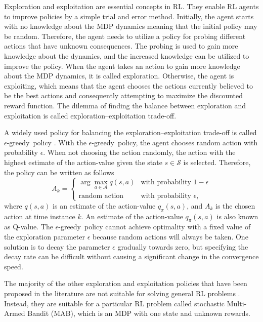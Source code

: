 \documentclass[english, 12pt, a4paper, elec, utf8, a-1b, online]{aaltothesis}
\numberwithin{equation}{section}
\newcommand{\Ss}{\mathcal{S}}
\newcommand{\As}{\mathcal{A}}
\newcommand{\egreedy}{$\epsilon$-greedy~}
\begin{document}
Exploration and exploitation are essential concepts in RL. 
They enable RL agents to improve policies by a simple trial and error method.
Initially, the agent starts with no knowledge about the MDP dynamics meaning that the initial policy may be random.
Therefore, the agent needs to utilize a policy for probing different actions that have unknown consequences.
The probing is used to gain more knowledge about the dynamics, and the increased knowledge can be utilized to improve the policy.
When the agent takes an action to gain more knowledge about the MDP dynamics, it is called exploration.
Otherwise, the agent is exploiting, which means that the agent chooses the actions currently believed to be the best actions and consequently attempting to maximize the discounted reward function.
The dilemma of finding the balance between exploration and exploitation is called exploration--exploitation trade-off.

A widely used policy for balancing the exploration--exploitation trade-off is called \egreedy policy \cite{Sutton2018}.
With the \egreedy policy, the agent chooses random action with probability $\epsilon$.
When not choosing the action randomly, the action with the highest estimate of the action-value given the state $s \in \Ss$ is selected.
Therefore, the policy can be written as follows
\begin{equation}\label{eq:epsilon_greedy}
    A_k =
    \left\{
        \begin{array}{ll}
            \arg\max_{a \in \As} q(s, a) & \text{with probability $1-\epsilon$}\\
            \text{random action} & \text{with probability $\epsilon$},
        \end{array}
    \right.
\end{equation}
where $q(s, a)$ is an estimate of the action-value $q_\pi(s, a)$, and $A_k$ is the chosen action at time instance $k$.
An estimate of the action-value $q_\pi(s, a)$ is also known as Q-value.
The \egreedy policy cannot achieve optimality with a fixed value of the exploration parameter $\epsilon$ because random actions will always be taken.
One solution is to decay the parameter $\epsilon$ gradually towards zero, but specifying the decay rate can be difficult without causing a significant change in the convergence speed.

The majority of the other exploration and exploitation policies that have been proposed in the literature are not suitable for solving general RL problems \cite{Lattimore2019}.
Instead, they are suitable for a particular RL problem called stochastic Multi-Armed Bandit (MAB), which is an MDP with one state and unknown rewards.
\end{document}
